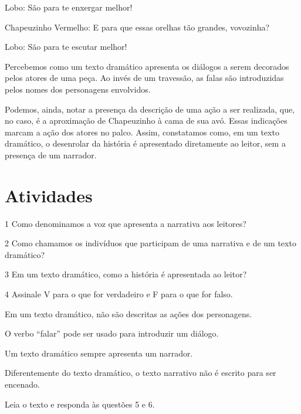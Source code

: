 {Lobo: São para te enxergar melhor!

Chapeuzinho Vermelho: E para que essas orelhas tão grandes, vovozinha?

Lobo: São para te escutar melhor!

Percebemos como um texto dramático apresenta os diálogos a serem
decorados pelos atores de uma peça. Ao invés de um travessão, as falas são introduzidas pelos nomes dos personagens envolvidos.

Podemos, ainda, notar a presença da descrição de uma ação a ser realizada, que,
no caso, é a aproximação de Chapeuzinho à cama de sua avó. Essas indicações marcam a ação dos atores no palco. Assim,
constatamos como, em um texto dramático, o desenrolar da história é
apresentado diretamente ao leitor, sem a presença de um narrador.}

\section*{Atividades}

\num{1} Como denominamos a voz que apresenta a narrativa aos leitores?


\num{2} Como chamamos os indivíduos que participam de uma narrativa e de um
texto dramático?


\num{3} Em um texto dramático, como a história é apresentada ao leitor?


\num{4} Assinale V para o que for verdadeiro e F para o que for falso.

\begin{boxlist}
 Em um texto dramático, não são descritas as ações dos personagens.

 O verbo “falar” pode ser usado para introduzir um diálogo.

 Um texto dramático sempre apresenta um narrador.

 Diferentemente do texto dramático, o texto narrativo não é escrito para ser encenado.
\end{boxlist}

\pagebreak
Leia o texto e responda às questões 5 e 6.

